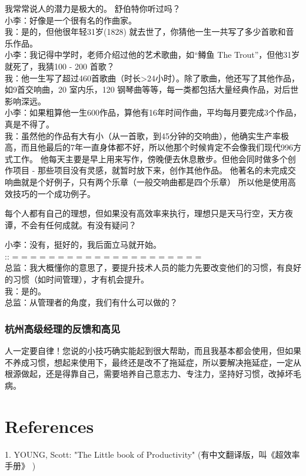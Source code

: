 我常常说人的潜力是极大的。 舒伯特你听过吗？\\
小李：好像是一个很有名的作曲家。\\
我：是的，但他很年轻31岁(1828)
就去世了，你猜他一生一共写了多少首歌和音乐作品。\\
小李：我记得中学时，老师介绍过他的艺术歌曲，如``鳟鱼 The
Trout''，但他31岁就死了，我猜100 - 200 首歌？\\
我：他一生写了超过460首歌曲（时长\textgreater{}24小时）。除了歌曲，他还写了其他作品，如9首交响曲，20
室内乐，120 钢琴曲等等，每一类都包括大量经典作品，对后世影响深远。\\
小李：如果粗算他一生600作品，算他有16年时间作曲，平均每月要完成3个作品，真是不得了。\\
我：虽然他的作品有大有小（从一首歌，到45分钟的交响曲），他确实生产率极高，而且他最后的7年一直身体都不好，所以他那个时候肯定不会像我们现代996方式工作。
他每天主要是早上用来写作，傍晚便去休息散步。但他会同时做多个创作项目 -
那些项目没有灵感，就暂时放下来，创作其他作品。
他著名的未完成交响曲就是个好例子，只有两个乐章（一般交响曲都是四个乐章）
所以他是使用高效技巧的一个成功例子。

每个人都有自己的理想，但如果没有高效率来执行，理想只是天马行空，天方夜谭，不会有任何成就。有没有疑问？

小李：没有，挺好的，我后面立马就开始。\\
:: = = = = = = = = = = = = = = = = = = = = =\\
总监：我大概懂你的意思了，要提升技术人员的能力先要改变他们的习惯，有良好的习惯（如时间管理），才有机会提升。\\
我：是的。\\
总监：从管理者的角度，我们有什么可以做的？\\


\hypertarget{ux676dux5ddeux9ad8ux7ea7ux7ecfux7406ux7684ux53cdux9988ux548cux9ad8ux89c1}{%
\subsubsection{杭州高级经理的反馈和高见}\label{ux676dux5ddeux9ad8ux7ea7ux7ecfux7406ux7684ux53cdux9988ux548cux9ad8ux89c1}}

人一定要自律！您说的小技巧确实能起到很大帮助，而且我基本都会使用，但如果不养成习惯，想起来使用下，最终还是改不了拖延症，所以要解决拖延症，一定从根源做起，还是得靠自己，需要培养自己意志力、专注力，坚持好习惯，改掉坏毛病。

\hypertarget{references}{%
\section{References}\label{references}}

1. YOUNG, Scott: "The Little book of Productivity"
(有中文翻译版，叫《超效率手册》 )\\




